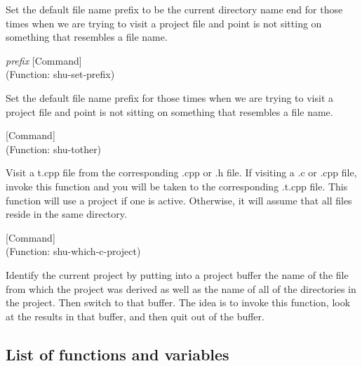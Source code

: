 \begin{doc-string}
Set the default file name prefix to be the current directory name end for those
times when we are trying to visit a project file and point is not sitting on
something that resembles a file name.
\end{doc-string}

\vspace{1em}
\noindent
{}
\usebox{\funcname}\emph{prefix}
 \hfill [Command]\\%
 (Function: shu-set-prefix)

\begin{doc-string}
Set the default file name prefix for those times when we are trying to visit
a project file and point is not sitting on something that resembles a file name.
\end{doc-string}

\vspace{1em}
\noindent
{}
\usebox{\funcname}
 \hfill [Command]\\%
 (Function: shu-tother)

\begin{doc-string}
Visit a t.cpp file from the corresponding .cpp or .h file.  If visiting a .c
or .cpp file, invoke this function and you will be taken to the corresponding
.t.cpp file.  This function will use a project if one is active.  Otherwise, it
will assume that all files reside in the same directory.
\end{doc-string}

\vspace{1em}
\noindent
{}
\usebox{\funcname}
 \hfill [Command]\\%
 (Function: shu-which-c-project)

\begin{doc-string}
Identify the current project by putting into a project buffer the name of the file
from which the project was derived as well as the name of all of the directories in the
project.  Then switch to that buffer.  The idea is to invoke this function, look at the
results in that buffer, and then quit out of the buffer.
\end{doc-string}

\subsection{List of functions and variables}

